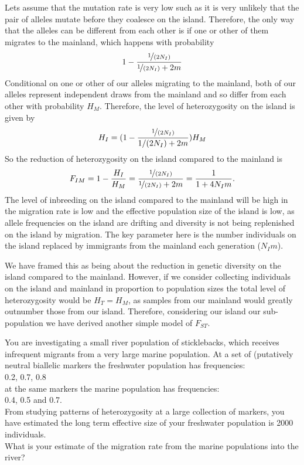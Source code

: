 Lets assume that the mutation rate is very low such as it is very
unlikely that the pair of alleles mutate before they coalesce on the
island. Therefore, the only way that the alleles can be different from
each other is if one or other of them migrates to the mainland, which
happens with probability  
\begin{equation}
  1 - \frac{\nicefrac{1}{(2N_I)}}{\nicefrac{1}{(2N_I)} + 2m}
\end{equation}
Conditional on one or other of our alleles migrating to the mainland,
both of our alleles represent independent draws from the mainland and
so differ from each other with probability $H_M$. Therefore, the level of
heterozygosity on the island is given by
\begin{equation}
  H_I = (1 - \frac{\nicefrac{1}{(2N_I)}}{1/(2N_I) + 2m})H_M
\end{equation}
So the reduction of heterozygosity on the island compared to the
mainland is
\begin{equation}
  F_{IM} = 1- \frac{H_I}{H_M} = \frac{\nicefrac{ 1}{(2N_I)}}{\nicefrac{1}{(2N_I)} + 2m} = \frac{ 1 }{1 + 4N_Im}.
\end{equation}
The level of inbreeding on the island compared to the mainland will
be high in the migration rate is low and the effective population size
of the island is low, as allele frequencies on the island are drifting
and diversity is not being replenished on the island by migration. The
key parameter here is the number individuals on the island replaced by
immigrants from the mainland each generation ($N_I m$).

We have framed this as being about the reduction in genetic diversity on the
island compared to the mainland. However, if we consider collecting 
individuals on the island and mainland in proportion to population
sizes the total level of heterozygosity would be $H_T=H_M$, as samples
from our mainland would greatly outnumber those from our
island. Therefore, considering our island our sub-population we have
derived another simple model of $F_{ST}$.

\begin{question}
You are investigating a small river population of sticklebacks, which receives infrequent migrants from a very large marine population. At a set of (putatively neutral biallelic markers the freshwater population has frequencies:\\
0.2, 0.7, 0.8\\
at the same markers the marine population has frequencies:\\
0.4, 0.5 and 0.7.\\
 From studying patterns of heterozygosity at a large collection of markers, you have estimated the long term effective size of your freshwater population is 2000 individuals.\\
What is your estimate of the migration rate from the marine
populations into the river?
\end{question}
\newpage

